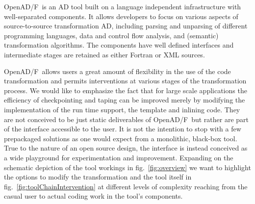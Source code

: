 \documentclass{book}
\newcommand{\OpenADF}{OpenAD/F}
\newcommand{\reffig}[1]{{fig.~\ref{#1}}}
\begin{document}
\OpenADF\ is an AD tool built on a language independent infrastructure with 
well-separated components. 
It 
allows developers to focus on various aspects of source-to-source 
transformation AD, including parsing and unparsing of different programming
languages, data and control flow analysis, and (semantic) transformation 
algorithms.
The components have well defined interfaces and intermediate stages 
are retained as either Fortran or XML sources. 
 
\OpenADF\ allows users a great amount of flexibility in the use of the code transformation
and permits interventions at various stages of the transformation process.
We would like to emphasize the fact that for large scale applications 
the efficiency of checkpointing and taping can be improved merely by 
modifying the implementation of the run time support, the template and inlining 
code. 
They are not conceived  to be just static 
deliverables of \OpenADF\ but rather are part of the 
interface accessible to the user.
It is not the intention to stop with a few prepackaged solutions as one 
would expect from a 
monolithic, black-box tool.  
True to the nature of an open source design, the interface is instead conceived as a 
wide playground for 
experimentation and improvement. 
Expanding on the schematic depiction 
of the tool workings in \reffig{fig:overview} we want to highlight 
the options to modify the transformation and the tool itself in \reffig{fig:toolChainIntervention} 
at different levels of complexity reaching from the casual user to 
actual coding work in the tool's components.    
\end{document}
